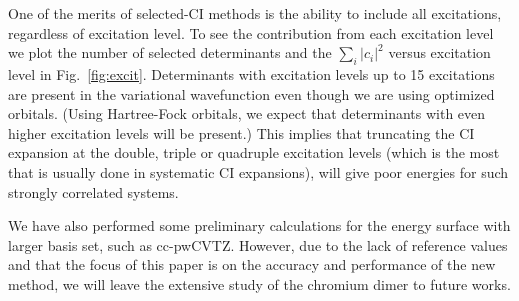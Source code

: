 \documentclass[%
preprint,
 superscriptaddress,
 amsmath,amssymb,
 aps,
]{revtex4-1}
\begin{document}
One of the merits of selected-CI methods is the ability to include all excitations, regardless of excitation level.
To see the contribution from each excitation level we plot the number of selected determinants and the $\sum_i \left|c_i\right|^2$ versus excitation level in Fig.~\ref{fig:excit}.
Determinants with excitation levels up to 15 excitations are present in the variational wavefunction even though we are using optimized orbitals.
(Using Hartree-Fock orbitals, we expect that determinants with even higher excitation levels will be present.)
This implies that truncating the CI expansion at the double, triple or quadruple excitation levels (which is the most that is usually done in systematic
CI expansions), will give poor energies for such strongly correlated systems.

{\color{blue} We have also performed some preliminary calculations for the energy surface with larger basis set, such as cc-pwCVTZ. However, due to the lack of reference values and that the focus of this paper is on the accuracy and performance of the new method, we will leave the extensive study of the chromium dimer to future works.}



\end{document}
